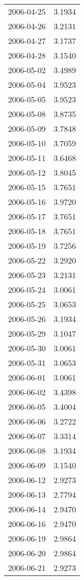\begin{tabular}{lr}
2006-04-25 &      3.1934 \\
2006-04-26 &      3.2131 \\
2006-04-27 &      3.1737 \\
2006-04-28 &      3.1540 \\
2006-05-02 &      3.4989 \\
2006-05-04 &      3.9523 \\
2006-05-05 &      3.9523 \\
2006-05-08 &      3.8735 \\
2006-05-09 &      3.7848 \\
2006-05-10 &      3.7059 \\
2006-05-11 &      3.6468 \\
2006-05-12 &      3.8045 \\
2006-05-15 &      3.7651 \\
2006-05-16 &      3.9720 \\
2006-05-17 &      3.7651 \\
2006-05-18 &      3.7651 \\
2006-05-19 &      3.7256 \\
2006-05-22 &      3.2920 \\
2006-05-23 &      3.2131 \\
2006-05-24 &      3.0061 \\
2006-05-25 &      3.0653 \\
2006-05-26 &      3.1934 \\
2006-05-29 &      3.1047 \\
2006-05-30 &      3.0061 \\
2006-05-31 &      3.0653 \\
2006-06-01 &      3.0061 \\
2006-06-02 &      3.4398 \\
2006-06-05 &      3.4004 \\
2006-06-06 &      3.2722 \\
2006-06-07 &      3.3314 \\
2006-06-08 &      3.1934 \\
2006-06-09 &      3.1540 \\
2006-06-12 &      2.9273 \\
2006-06-13 &      2.7794 \\
2006-06-14 &      2.9470 \\
2006-06-16 &      2.9470 \\
2006-06-19 &      2.9864 \\
2006-06-20 &      2.9864 \\
2006-06-21 &      2.9273 \\

\end{tabular}
